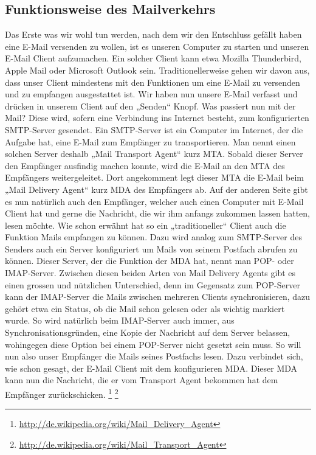 \subsection{Funktionsweise des Mailverkehrs}
Das Erste was wir wohl tun werden, nach dem wir den Entschluss gefällt haben eine E-Mail versenden zu wollen, ist es unseren Computer zu starten und unseren E-Mail Client aufzumachen. Ein solcher Client kann etwa Mozilla Thunderbird, Apple Mail oder Microsoft Outlook sein. Traditionellerweise gehen wir davon aus, dass unser Client mindestens mit den Funktionen um eine E-Mail zu versenden und zu empfangen ausgestattet ist.
Wir haben nun unsere E-Mail verfasst und drücken in unserem Client auf den „Senden“ Knopf. Was passiert nun mit der Mail?
Diese wird, sofern eine Verbindung ins Internet besteht, zum konfigurierten SMTP-Server gesendet. Ein SMTP-Server ist ein Computer im Internet, der die Aufgabe hat, eine E-Mail zum Empfänger zu transportieren. Man nennt einen solchen Server deshalb „Mail Transport Agent“ kurz MTA. Sobald dieser Server den Empfänger ausfindig machen konnte, wird die E-Mail an den MTA des Empfängers weitergeleitet. Dort angekomment legt dieser MTA die E-Mail beim „Mail Delivery Agent“ kurz MDA des Empfängers ab.
Auf der anderen Seite gibt es nun natürlich auch den Empfänger, welcher auch einen Computer mit E-Mail Client hat und gerne die Nachricht, die wir ihm anfangs zukommen lassen hatten, lesen möchte. Wie schon erwähnt hat so ein „traditioneller“ Client auch die Funktion Mails empfangen zu können. Dazu wird analog zum SMTP-Server des Senders auch ein Server konfiguriert um Mails von seinem Postfach abrufen zu können. Dieser Server, der die Funktion der MDA hat, nennt man POP- oder IMAP-Server. Zwischen diesen beiden Arten von Mail Delivery Agents gibt es einen grossen und nützlichen Unterschied, denn im Gegensatz zum POP-Server kann der IMAP-Server die Mails zwischen mehreren Clients synchronisieren, dazu gehört etwa ein Status, ob die Mail schon gelesen oder als wichtig markiert wurde. So wird natürlich beim IMAP-Server auch immer, aus Synchronisationsgründen, eine Kopie der Nachricht auf dem Server belassen, wohingegen diese Option bei einem POP-Server nicht gesetzt sein muss.
So will nun also unser Empfänger die Mails seines Postfachs lesen. Dazu verbindet sich, wie schon gesagt, der E-Mail Client mit dem konfigurieren MDA. Dieser MDA kann nun die Nachricht, die er vom Transport Agent bekommen hat dem Empfänger zurückschicken.
\footnote{\url{http://de.wikipedia.org/wiki/Mail_Delivery_Agent}}
\footnote{\url{http://de.wikipedia.org/wiki/Mail_Transport_Agent}}
\\

